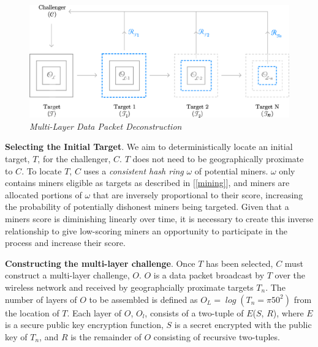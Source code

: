 \documentclass[letterpaper,11pt]{article}
\begin{document}
\begin{figure}[H]
	\begin{center}
  		\includegraphics[width=\textwidth]{diagram2.eps}
  		\caption{\emph{Multi-Layer Data Packet Deconstruction}}
  		\label{fig:poc-construction}
 	\end{center}
\end{figure}

\textbf{Selecting the Initial Target}. We aim to deterministically locate an initial target, $\mathit{T}$, for the challenger, $\mathit{C}$. $\mathit{T}$ does not need to be geographically proximate to $\mathit{C}$. To locate $\mathit{T}$, $\mathit{C}$ uses a \emph{consistent hash ring} $\mathit{\omega}$ of potential miners. $\mathit{\omega}$ only contains miners eligible as targets as described in [\ref{mining}], and miners are allocated portions of $\mathit{\omega}$ that are inversely proportional to their score, increasing the probability of potentially dishonest miners being targeted. Given that a miners score is diminishing linearly over time, it is necessary to create this inverse relationship to give low-scoring miners an opportunity to participate in the process and increase their score.\newline

\textbf{Constructing the multi-layer challenge}. Once $\mathit{T}$ has been selected, $\mathit{C}$ must construct a multi-layer challenge, $\mathit{O}$. $\mathit{O}$ is a data packet broadcast by $\mathit{T}$ over the wireless network and received by geographcially proximate targets $\mathit{T_n}$. The number of layers of $\mathit{O}$ to be assembled is defined as $\mathit{O_L = \log \left(T_n = \pi50^2\right)}$ from the location of $\mathit{T}$. Each layer of $\mathit{O}$, $\mathit{O_l}$, consists of a two-tuple of $\mathit{E}$($\mathit{S}$, $\mathit{R}$), where $\mathit{E}$ is a secure public key encryption function, $\mathit{S}$ is a secret encrypted with the public key of $\mathit{T_n}$, and $\mathit{R}$ is the remainder of $\mathit{O}$ consisting of recursive two-tuples.\newline
\end{document}

